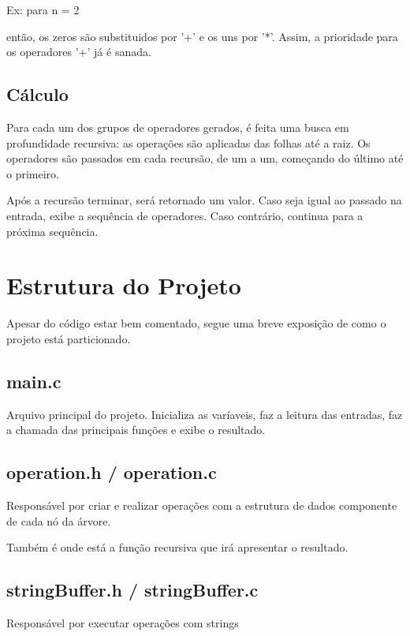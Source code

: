 \documentclass{article}
\begin{document}
Ex: para n = 2

{\par
}
{\par
}
{\par
}
{\par
}
então, os zeros são substituidos por '+' e os uns por '*'. Assim, a prioridade para os operadores '+' já é sanada.

\subsection{Cálculo}
Para cada um dos grupos de operadores gerados, é feita uma busca em profundidade recursiva: as operações são aplicadas das folhas até a raiz.
Os operadores são passados em cada recursão, de um a um, começando do último até o primeiro.

Após a recursão terminar, será retornado um valor. Caso seja igual ao passado na entrada, exibe a sequência de operadores. Caso contrário, continua para a próxima sequência.


\section{Estrutura do Projeto}

Apesar do código estar bem comentado, segue uma breve exposição de como o projeto está particionado.

\subsection{main.c}
Arquivo principal do projeto. Inicializa as varíaveis, faz a leitura das entradas, faz a chamada das principais funções e exibe o resultado.

\subsection{operation.h / operation.c}
Responsável por criar e realizar operações com a estrutura de dados componente de cada nó da árvore.

Também é onde está a função recursiva que irá apresentar o resultado.

\subsection{stringBuffer.h / stringBuffer.c}
Responsável por executar operações com strings
\end{document}
